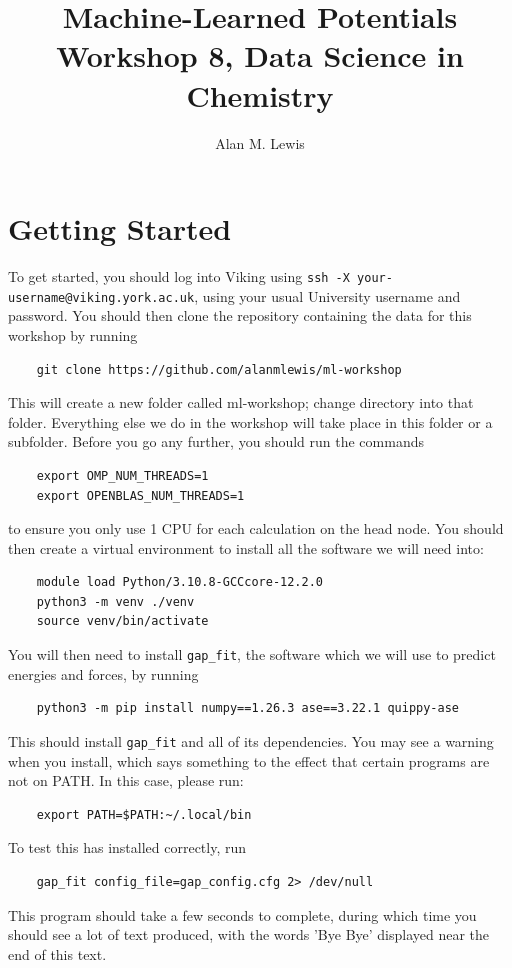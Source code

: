 \documentclass{article}
\title{Machine-Learned Potentials \\ Workshop 8, Data Science in Chemistry}
\author{Alan M. Lewis}
\date{}
\begin{document}
\maketitle

\section{Getting Started}

To get started, you should log into Viking using \verb|ssh -X your-username@viking.york.ac.uk|, using your usual University username and password. You should then clone the repository containing the data for this workshop by running
\begin{Verbatim}
    git clone https://github.com/alanmlewis/ml-workshop
\end{Verbatim}
This will create a new folder called ml-workshop; change directory into that folder. Everything else we do in the workshop will take place in this folder or a subfolder. Before you go any further, you should run the commands
\begin{Verbatim}
    export OMP_NUM_THREADS=1
    export OPENBLAS_NUM_THREADS=1
\end{Verbatim}
to ensure you only use 1 CPU for each calculation on the head node. You should then create a virtual environment to install all the software we will need into:
\begin{Verbatim}
    module load Python/3.10.8-GCCcore-12.2.0
    python3 -m venv ./venv
    source venv/bin/activate
\end{Verbatim}
You will then need to install \verb|gap_fit|, the software which we will use to predict energies and forces, by running
\begin{Verbatim}
    python3 -m pip install numpy==1.26.3 ase==3.22.1 quippy-ase
\end{Verbatim}
This should install \verb|gap_fit| and all of its dependencies. You may see a warning when you install, which says something to the effect that certain programs are not on PATH. In this case, please run:
\begin{Verbatim}
    export PATH=$PATH:~/.local/bin
\end{Verbatim}
To test this has installed correctly, run
\begin{Verbatim}
    gap_fit config_file=gap_config.cfg 2> /dev/null
\end{Verbatim}
This program should take a few seconds to complete, during which time you should see a lot of text produced, with the words 'Bye Bye' displayed near the end of this text.
\end{document}
